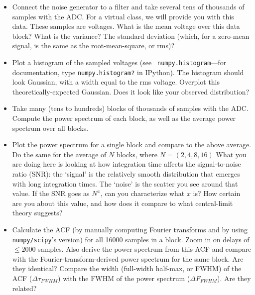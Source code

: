 \documentclass[11pt,preprint]{aastex}
\begin{document}
\begin{itemize}

\item Connect the noise generator to a 
  filter and take several tens of thousands of samples
  with the ADC.
{\color{red} For a virtual class, we will provide you with this data.}
  These samples are voltages. What is the
  mean voltage over this data block?
  What is the variance? The standard deviation (which, for a zero-mean signal,
  is the same as the root-mean-square, or rms)?

\item Plot a histogram of the sampled voltages (see {\tt
  numpy.histogram}---for documentation, type {\tt numpy.histogram?} in IPython).
  The histogram
  should look Gaussian, with a width equal to the rms
  voltage. Overplot this theoretically-expected Gaussian. Does it look
  like your observed distribution?

\item Take many (tens to hundreds) blocks of thousands of samples with the ADC. 
  Compute the power spectrum
  of each block, as well as the average power spectrum over all blocks.

\item Plot the power spectrum for a single block and compare to the
  above average. Do the same for the average of $N$ blocks, where $N=(2,
  4, 8, 16)$ What you are doing here is looking at how integration time
  affects the signal-to-noise ratio (SNR): the `signal' is the relatively
  smooth distribution that emerges with long integration times.
  The `noise' is the scatter you see around that value. If the SNR goes as
  $N^x$, can you characterize what $x$ is? How certain are you about this value, and
  how does it compare to what central-limit theory suggests?

\item Calculate the ACF (by manually computing Fourier transforms and by using \verb$numpy/scipy$'s version)
  for all
  16000 samples in a block. Zoom in on delays of $\le 2000$ samples. Also derive the power
  spectrum from this ACF and compare with the Fourier-transform-derived power
  spectrum for the same block.  Are they identical?
  Compare the width (full-width half-max, or FWHM) of the ACF ($\Delta
  \tau_{FWHM}$) with the FWHM of the power spectrum ($\Delta
  F_{FWHM}$). Are they related?

\end{itemize}

\end{document}
